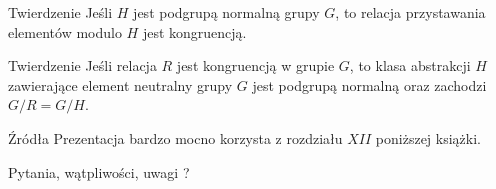 \documentclass{beamer}
\begin{document}
\begin{frame}
    \begin{block}{Twierdzenie}
        Jeśli $H$ jest podgrupą normalną grupy $G$, to relacja przystawania elementów modulo $H$ jest kongruencją.
    \end{block}
    \pause 
    \begin{block}{Twierdzenie}
        Jeśli relacja $R$  jest kongruencją w grupie $G$, to klasa abstrakcji $H$ zawierające element neutralny grupy $G$ jest podgrupą normalną
        oraz zachodzi $G/R = G/H$.
    \end{block}
\end{frame}

\begin{frame}{Źródła}
    Prezentacja bardzo mocno korzysta z rozdziału $XII$ poniższej książki.
    \printbibliography
\end{frame}

\begin{frame}
    \centering 
    \LARGE Pytania, wątpliwości, uwagi ? 
\end{frame}
\end{document}
